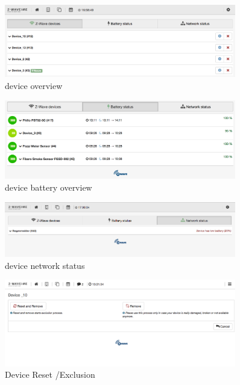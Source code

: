 \begin{figure}
\begin{center}
\includegraphics[width=0.9\textwidth]{pngs/cap4/incl6.png}
\caption{\zwave device overview}
\label{incl6}
\end{center}
\end{figure}

\begin{figure}
\begin{center}
\includegraphics[width=0.9\textwidth]{pngs/cap4/incl7.png}
\caption{\zwave device battery overview}
\label{incl7}
\end{center}
\end{figure}

\begin{figure}
\begin{center}
\includegraphics[width=0.9\textwidth]{pngs/cap4/incl8.png}
\caption{\zwave device network status}
\label{incl8}
\end{center}
\end{figure}

\begin{figure}
\begin{center}
\includegraphics[width=0.9\textwidth]{pngs/cap4/devicereset.png}
\caption{\zwave Device Reset /Exclusion}
\label{incldr}
\end{center}
\end{figure}

